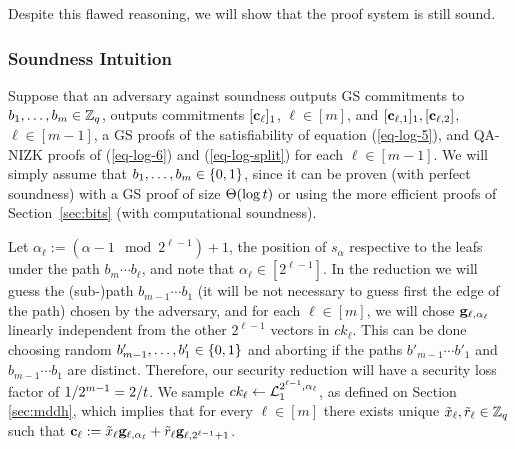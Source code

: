 Despite this flawed reasoning, we will show that the proof system is still sound.

\subsubsection{Soundness Intuition}
Suppose that an adversary against soundness outputs GS commitments to \(b_1,\ldots,b_{m}\in\mathbb{Z}_q\), outputs commitments \([\mathbf{c}_\ell]_1\), $\ell\in[m]$, and \([\mathbf{c}_{\ell,1}]_1,[\mathbf{c}_{\ell,2}]\), $\ell\in[m-1]$, a GS proofs of the satisfiability of equation (\ref{eq-log-5}), and QA-NIZK proofs of (\ref{eq-log-6}) and (\ref{eq-log-split}) for each \(\ell\in[m-1]\).
We will simply assume that \(b_1,\ldots,b_m\in\{0,1\}\), since it can be proven (with perfect soundness) with a GS proof of size \(\Theta(\log t )\) or using the more efficient proofs of Section~\ref{sec:bits} (with computational soundness).

Let $\alpha_\ell:=(\alpha-1 \mod 2^{\ell-1})+1$, the position of $s_\alpha$ respective to the leafs under the path $b_m\cdots b_\ell$, and note that $\alpha_\ell \in[2^{\ell-1}]$.
In the reduction we will guess the (sub-)path $b_{m-1}\cdots b_1$ (it will be not necessary to guess first the edge of the path) chosen by the adversary, and for each $\ell\in[m]$, we will chose $\mathbf{g}_{\ell,\alpha_\ell}$ linearly independent from the other $2^{\ell-1}$ vectors in $ck_\ell$. This can be done choosing  random $b'_{m-1},\ldots, b'_1\in\{0,1\}$ and aborting if the paths $b'_{m-1}\cdots b'_{1}$ and $b_{m-1}\cdots b_1$ are distinct. Therefore, our security reduction will have a security loss factor of $1/2^{m-1}=2/t$. We sample $ck_\ell\gets\mathcal{L}_1^{2^{\ell-1},\alpha_\ell}$, as defined on Section \ref{sec:mddh}, which implies that for every $\ell\in[m]$ there exists unique $\tilde{x}_{\ell},\tilde{r}_\ell\in\mathbb{Z}_q$ such that $\mathbf{c}_\ell:=\tilde{x}_\ell\mathbf{g}_{\ell,\alpha_\ell}+\tilde{r}_\ell\mathbf{g}_{\ell,2^{\ell-1}+1}$.

